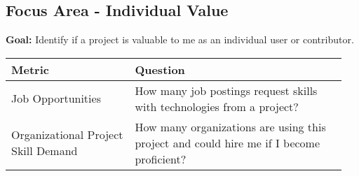 
\subsection{Focus Area - Individual Value}
\textbf{Goal:} Identify if a project is valuable to me as an individual user or contributor.
\begin{table}[ht!]
    \centering
    \begin{tabular}{|p{0.35\linewidth} | p{0.6\linewidth}|}
        \hline
        \hfil \textbf{Metric}  & \hfil \textbf{Question} \\
        \hline
		Job Opportunities & How many job postings request skills with technologies from a project? \\ 
		\hline
		Organizational Project Skill Demand & How many organizations are using this project and could hire me if I become proficient? \\ 
		\hline
    \end{tabular}
\end{table}

 
 

